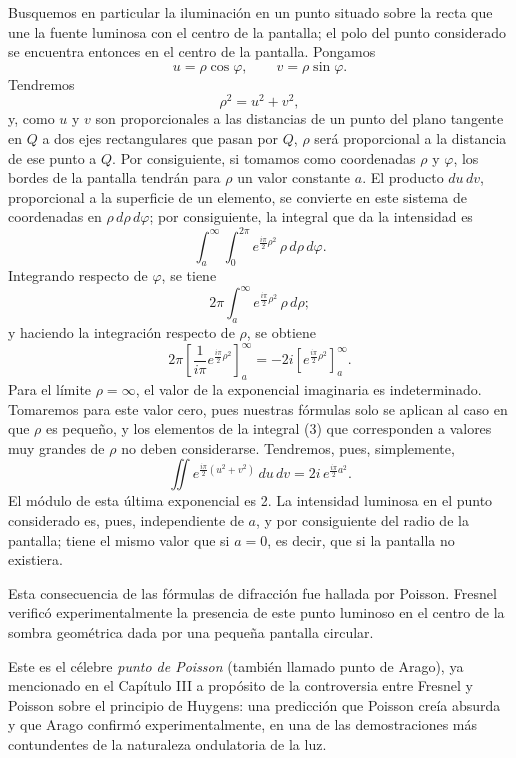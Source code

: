 Busquemos en particular la iluminación en un punto situado sobre la recta
que une la fuente luminosa con el centro de la pantalla; el polo del
punto considerado se encuentra entonces en el centro de la pantalla.
Pongamos
\[
u=\rho\cos\varphi,\qquad v=\rho\sin\varphi.
\]
Tendremos
\[
\rho^2=u^2+v^2,
\]
y, como $u$ y $v$ son proporcionales a las distancias de un punto del
plano tangente en $Q$ a dos ejes rectangulares que pasan por $Q$, $\rho$
será proporcional a la distancia de ese punto a $Q$. Por consiguiente, si
tomamos como coordenadas $\rho$ y $\varphi$, los bordes de la pantalla
tendrán para $\rho$ un valor constante $a$. El producto $du\,dv$,
proporcional a la superficie de un elemento, se convierte en este sistema
de coordenadas en $\rho\,d\rho\,d\varphi$; por consiguiente, la integral
que da la intensidad es
\begin{equation}
\int_a^\infty\int_0^{2\pi} e^{\frac{i\pi}{2}\rho^2}\,\rho\,d\rho\,d\varphi.
\tag{2}
\end{equation}
Integrando respecto de $\varphi$, se tiene
\begin{equation}
2\pi\int_a^\infty e^{\frac{i\pi}{2}\rho^2}\,\rho\,d\rho;
\tag{3}
\end{equation}
y haciendo la integración respecto de $\rho$, se obtiene
\[
2\pi\left[\frac{1}{i\pi}e^{\frac{i\pi}{2}\rho^2}\right]_a^\infty
= -2i\left[e^{\frac{i\pi}{2}\rho^2}\right]_a^\infty.
\]
Para el límite $\rho=\infty$, el valor de la exponencial imaginaria es
indeterminado. Tomaremos para este valor cero, pues nuestras fórmulas
solo se aplican al caso en que $\rho$ es pequeño, y los elementos de la
integral (3) que corresponden a valores muy grandes de $\rho$ no deben
considerarse. Tendremos, pues, simplemente,
\[
\iint e^{\frac{i\pi}{2}(u^2+v^2)}\,du\,dv = 2i\,e^{\frac{i\pi}{2}a^2}.
\]
El módulo de esta última exponencial es 2. La intensidad luminosa en el
punto considerado es, pues, independiente de $a$, y por consiguiente del
radio de la pantalla; tiene el mismo valor que si $a=0$, es decir, que si
la pantalla no existiera.

Esta consecuencia de las fórmulas de difracción fue hallada por Poisson.
Fresnel verificó experimentalmente la presencia de este punto luminoso en
el centro de la sombra geométrica dada por una pequeña pantalla circular.

\begin{notahistorica}
Este es el célebre \emph{punto de Poisson} (también llamado punto de
Arago), ya mencionado en el Capítulo III a propósito de la controversia
entre Fresnel y Poisson sobre el principio de Huygens: una predicción que
Poisson creía absurda y que Arago confirmó experimentalmente, en una de
las demostraciones más contundentes de la naturaleza ondulatoria de la
luz.
\end{notahistorica}

